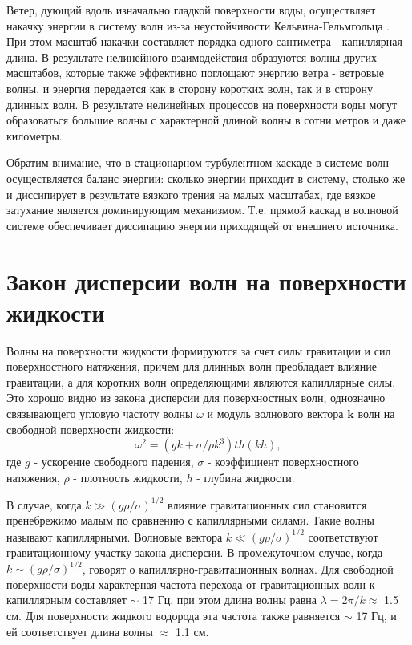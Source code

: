 Ветер, дующий вдоль изначально гладкой поверхности воды, осуществляет накачку энергии в систему волн из-за неустойчивости Кельвина-Гельмгольца \cite[c. 99]{NonLinearWaves}. При этом масштаб накачки составляет порядка одного сантиметра - капиллярная длина. В результате нелинейного взаимодействия образуются волны других масштабов, которые также эффективно поглощают энергию ветра - ветровые волны, и энергия передается как в сторону коротких волн, так и в сторону длинных волн. В результате нелинейных процессов на поверхности воды могут образоваться большие волны с характерной длиной волны в сотни метров и даже километры. 

Обратим внимание, что в стационарном турбулентном каскаде в системе волн осуществляется баланс энергии: сколько энергии приходит в систему, столько же и диссипирует в результате вязкого трения на малых масштабах, где вязкое затухание является доминирующим механизмом. Т.е. прямой каскад в волновой системе обеспечивает диссипацию энергии приходящей от внешнего источника. 


\section{Закон дисперсии волн на поверхности жидкости}%

Волны на поверхности жидкости формируются за счет силы гравитации и сил поверхностного натяжения, причем для длинных волн преобладает влияние гравитации, а для коротких волн определяющими являются капиллярные силы. Это хорошо видно из закона дисперсии для поверхностных волн, однозначно связывающего угловую частоту волны $\omega$ и модуль волнового вектора $\mathbf{k}$ волн на свободной поверхности жидкости:
\begin{equation}
 \label{eq:disper_dip}
\omega^2 = (gk + \sigma/\rho k^3)th(kh),
\end{equation}
где $g$ - ускорение свободного падения, $\sigma$ - коэффициент поверхностного натяжения, $\rho$ - плотность жидкости, $h$ - глубина жидкости.

В случае, когда $k \gg (g\rho/\sigma)^{1/2}$ влияние гравитационных сил становится пренебрежимо малым по сравнению с капиллярными силами. Такие волны называют капиллярными. Волновые вектора $k \ll (g\rho/\sigma)^{1/2}$ соответствуют гравитационному участку закона дисперсии. В промежуточном случае, когда $k \sim (g\rho/\sigma)^{1/2}$, говорят о капиллярно-гравитационных волнах. Для свободной поверхности воды характерная частота перехода от гравитационных волн к капиллярным составляет $\sim$ 17 Гц, при этом длина волны равна $\lambda = 2\pi/k \approx$ 1.5 см. Для поверхности жидкого водорода эта частота также равняется $\sim$ 17 Гц, и ей соответствует длина волны $\approx$ 1.1 см.


